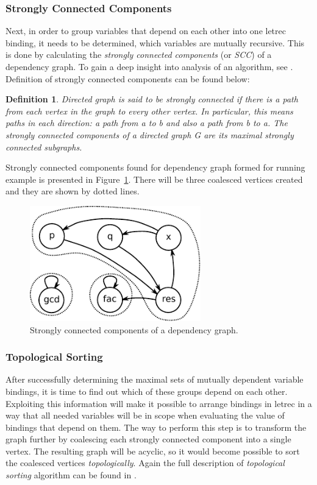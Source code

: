 \documentclass[12pt,a4paper]{report}
\newtheorem{definition}{Definition}[chapter]
\begin{document}
\subsubsection{Strongly Connected Components}
Next, in order to group variables that depend on each other into one letrec
binding, it needs to be determined, which variables are mutually recursive. This is
done by calculating the \textit{strongly connected components} (or
\textit{SCC}) of a dependency graph. To gain a deep insight into analysis of an
algorithm, see \cite{Cormen03}. Definition of strongly connected components can
be found below:

\begin{definition}
Directed graph is said to be strongly connected if there is a path from each
vertex in the graph to every other vertex. In particular, this means paths in
each direction: a path from a to b and also a path from b to a.
The strongly connected components of a directed graph G are its maximal
strongly connected subgraphs.
\end{definition}

Strongly connected components found for dependency graph formed for running
example is presented in Figure~\ref{fig:topsorted_scc}. There will be three
coalesced vertices created and they are shown by dotted lines.

\vspace*{0.2in}
\begin{figure}[h!]
  \centering
  \includegraphics[height=5cm]{scc_graph}
  \caption{Strongly connected components of a dependency graph.}
  \label{fig:topsorted_scc}
\end{figure}

\subsubsection{Topological Sorting}
After successfully determining the maximal sets of mutually dependent variable
bindings, it is time to find out which of these groups depend on each other.
Exploiting this information will make it possible to arrange bindings in letrec
in a way that all needed variables will be in scope when evaluating the value
of bindings that depend on them. The way to perform this step is to transform
the graph further by coalescing each strongly connected component into a single
vertex.  The resulting graph will be acyclic, so it would become possible to
sort the coalesced vertices \textit{topologically}. Again the full description
of \textit{topological sorting} algorithm can be found in \cite{Cormen03}.
\end{document}
